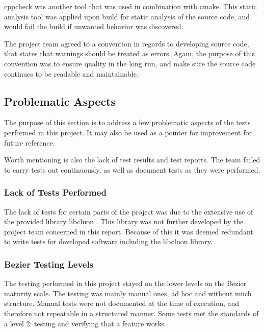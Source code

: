 \documentclass[12pt]{article}
\begin{document}
cppcheck\cite{cppcheck} was another tool that was used in combination with cmake. This static analysis tool was applied upon build for static analysis of the source code, and would fail the build if unwanted behavior was discovered.

The project team agreed to a convention in regards to developing source code, that states that warnings should be treated as errors. Again, the purpose of this convention was to ensure quality in the long run, and make sure the source code continues to be readable and maintainable.  

\subsection{Problematic Aspects} \label{test issues}
The purpose of this section is to address a few problematic aspects of the tests performed in this project. It may also be used as a pointer for improvement for future reference.

Worth mentioning is also the lack of test results and test reports. The team failed to carry tests out continuously, as well as document tests as they were performed. 

\subsubsection{Lack of Tests Performed}
The lack of tests for certain parts of the project was due to the extensive use of the provided library libcluon \cite{libcluon}. This library was not further developed by the project team concerned in this report. Because of this it was deemed redundant to write tests for developed software including the libcluon library.      

\subsubsection{Bezier Testing Levels}
The testing performed in this project stayed on the lower levels on the Bezier maturity scale. The testing was mainly manual ones, ad hoc and without much structure. Manual tests were not documented at the time of execution, and therefore not repeatable in a structured manner. Some tests met the standards of a level 2: testing and verifying that a feature works. 

\pagebreak

\end{document}
